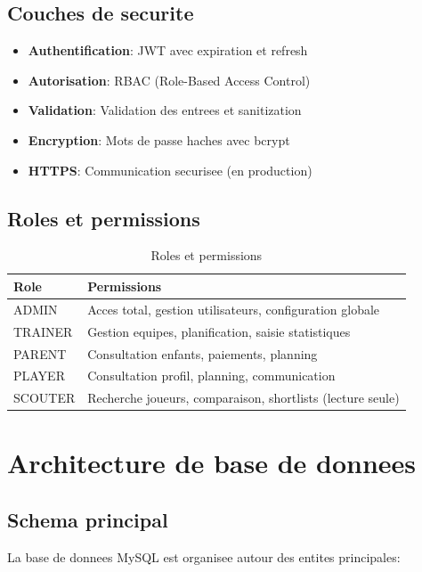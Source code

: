 \subsection*{Couches de securite}

\begin{itemize}[leftmargin=*]
  \item \textbf{Authentification}: JWT avec expiration et refresh
  \item \textbf{Autorisation}: RBAC (Role-Based Access Control)
  \item \textbf{Validation}: Validation des entrees et sanitization
  \item \textbf{Encryption}: Mots de passe haches avec bcrypt
  \item \textbf{HTTPS}: Communication securisee (en production)
\end{itemize}

\subsection*{Roles et permissions}

\begin{table}[H]
\centering
\begin{tabular}{p{} p{}}
\toprule
\textbf{Role} & \textbf{Permissions} \\
\midrule
ADMIN & Acces total, gestion utilisateurs, configuration globale \\
TRAINER & Gestion equipes, planification, saisie statistiques \\
PARENT & Consultation enfants, paiements, planning \\
PLAYER & Consultation profil, planning, communication \\
SCOUTER & Recherche joueurs, comparaison, shortlists (lecture seule) \\
\bottomrule
\end{tabular}
\caption{Roles et permissions}
\end{table}

\section{Architecture de base de donnees}

\subsection*{Schema principal}

La base de donnees MySQL est organisee autour des entites principales:

